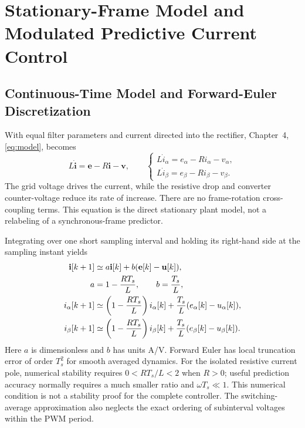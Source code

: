 \section{Stationary-Frame Model and Modulated Predictive Current Control}
\label{sec:ch5-mmpcc}
\subsection{Continuous-Time Model and Forward-Euler Discretization}
With equal filter parameters and current directed into the rectifier, Chapter~4, \eqref{eq:model}, becomes
\begin{equation}
L\dot{\mathbf i}=\mathbf e-R\mathbf i-\mathbf v,
\qquad
\begin{cases}
L\dot i_\alpha=e_\alpha-Ri_\alpha-v_\alpha,\\
L\dot i_\beta=e_\beta-Ri_\beta-v_\beta.
\end{cases}
\label{eq:ch5-plant}
\end{equation}
The grid voltage drives the current, while the resistive drop and converter counter-voltage reduce its rate of increase. There are no frame-rotation cross-coupling terms. This equation is the direct stationary plant model, not a relabeling of a synchronous-frame predictor.

Integrating over one short sampling interval and holding its right-hand side at the sampling instant yields
\begin{align}
\mathbf i[k+1]&\simeq a\mathbf i[k]+b(\mathbf e[k]-\mathbf u[k]),\notag\\
a&=1-\frac{RT_s}{L},\qquad b=\frac{T_s}{L},
\label{eq:ch5-fe}\\
i_\alpha[k+1]&\simeq\left(1-\frac{RT_s}{L}\right)i_\alpha[k]
+\frac{T_s}{L}(e_\alpha[k]-u_\alpha[k]),\notag\\
i_\beta[k+1]&\simeq\left(1-\frac{RT_s}{L}\right)i_\beta[k]
+\frac{T_s}{L}(e_\beta[k]-u_\beta[k]).
\label{eq:ch5-fe-components}
\end{align}
Here $a$ is dimensionless and $b$ has units A/V. Forward Euler has local truncation error of order $T_s^2$ for smooth averaged dynamics. For the isolated resistive current pole, numerical stability requires $0<RT_s/L<2$ when $R>0$; useful prediction accuracy normally requires a much smaller ratio and $\omega T_s\ll1$. This numerical condition is not a stability proof for the complete controller. The switching-average approximation also neglects the exact ordering of subinterval voltages within the PWM period.

